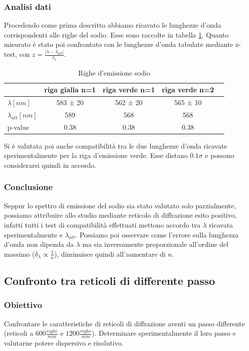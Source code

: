 \documentclass[a4paper]{article}
\begin{document}
\subsubsection{Analisi dati}
Procedendo come prima descritto abbiamo ricavato le lunghezze d'onda corrispondenti alle righe del sodio. Esse sono raccolte in tabella \ref{tab:lunghezza_d'onda.sodio}. Quanto misurato è stato poi confrontato con le lunghezze d'onda tabulate mediante z-test, con $z=\frac{|\lambda-\lambda_{att}|}{\delta_{\lambda}}$.

\begin{table}[htbp]
\centering
\begin{tabular}{|l|c|c|c|c|}
\hline
 & riga gialla n=1 & riga verde n=1 & riga verde n=2  \\\hline
$\lambda [nm] $ & 583 ± 20 & 562 ± 20 & 565 ± 10 \\\hline
$\lambda_{att} [nm]$ & 589 & 568 & 568 \\\hline
p-value & 0.38 & 0.38 & 0.38 \\\hline
\end{tabular}
\caption{Righe d'emissione sodio}
\label{tab:lunghezza_d'onda.sodio}
\end{table}

Si è valutata poi anche compatibilità tra le due lunghezze d'onda ricavate sperimentalmente per la riga d'emissione verde. Esse distano $0.1\sigma$ e possono considerarsi quindi in accordo.

\subsubsection{Conclusione}
Seppur lo spettro di emissione del sodio sia stato valutato solo parzialmente, possiamo attribuire allo studio mediante reticolo di diffrazione esito positivo, infatti tutti i test di compatibilità effettuati mettono accordo tra $\lambda$ ricavata sperimentalmente e $\lambda_{att}$. Possiamo poi osservare come l'errore sulla lunghezza d'onda non dipenda da $\lambda$ ma sia inversamente proporzionale all'ordine del massimo ($\delta_{\lambda} \propto \frac{1}{n}$), diminuisce quindi all'aumentare di $n$. 



\subsection{Confronto tra reticoli di differente passo}

\subsubsection{Obiettivo}
Confrontare le caratteristiche di reticoli di diffrazione aventi un passo differente (reticoli a $600 \frac{righe}{mm}$ e $1200 \frac{righe}{mm}$). Determinare sperimentalmente il loro passo e valutarne potere dispersivo e risolutivo.
\end{document}
